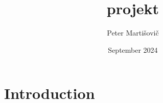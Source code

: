 \documentclass{article}
\title{projekt}
\author{Peter Martišovič}
\date{September 2024}
\begin{document}
\maketitle

\section{Introduction}
\end{document}
